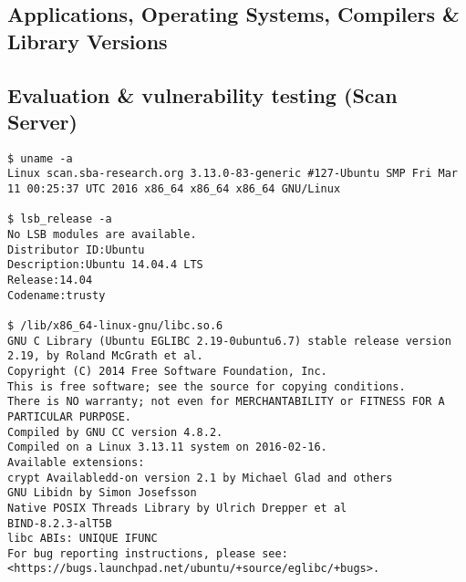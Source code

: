 \documentclass[10pt, a4paper]{article}
\begin{document}
\begin{appendices}
%
%
%
%
%

\section{Applications, Operating Systems, Compilers \& Library Versions} \label{app:vers}

\subsection{Evaluation \& vulnerability testing (Scan Server)}

\begin{verbatim}
$ uname -a
Linux scan.sba-research.org 3.13.0-83-generic #127-Ubuntu SMP Fri Mar 11 00:25:37 UTC 2016 x86_64 x86_64 x86_64 GNU/Linux

$ lsb_release -a
No LSB modules are available.
Distributor ID:Ubuntu
Description:Ubuntu 14.04.4 LTS
Release:14.04
Codename:trusty

$ /lib/x86_64-linux-gnu/libc.so.6
GNU C Library (Ubuntu EGLIBC 2.19-0ubuntu6.7) stable release version 2.19, by Roland McGrath et al.
Copyright (C) 2014 Free Software Foundation, Inc.
This is free software; see the source for copying conditions.
There is NO warranty; not even for MERCHANTABILITY or FITNESS FOR A
PARTICULAR PURPOSE.
Compiled by GNU CC version 4.8.2.
Compiled on a Linux 3.13.11 system on 2016-02-16.
Available extensions:
crypt Availabledd-on version 2.1 by Michael Glad and others
GNU Libidn by Simon Josefsson
Native POSIX Threads Library by Ulrich Drepper et al
BIND-8.2.3-alT5B
libc ABIs: UNIQUE IFUNC
For bug reporting instructions, please see:
<https://bugs.launchpad.net/ubuntu/+source/eglibc/+bugs>.


\end{verbatim}
\end{appendices}
\end{document}
